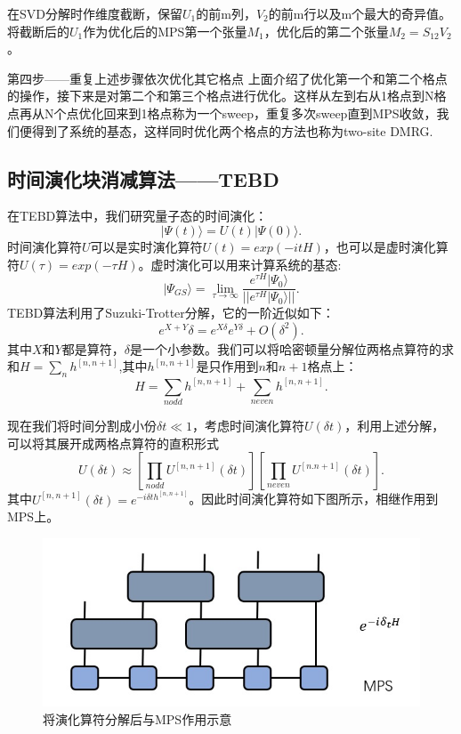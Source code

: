 \documentclass[12pt]{article}
\begin{document}
      在SVD分解时作维度截断，保留$U_1$的前m列，$V_2$的前m行以及m个最大的奇异值。将截断后的$U_1$作为优化后的MPS第一个张量$M_1$，优化后的第二个张量$M_2=S_{12}V_2$。
      
      {\heiti 第四步——重复上述步骤依次优化其它格点}
      上面介绍了优化第一个和第二个格点的操作，接下来是对第二个和第三个格点进行优化。这样从左到右从1格点到N格点再从N个点优化回来到1格点称为一个sweep，重复多次sweep直到MPS收敛，我们便得到了系统的基态，这样同时优化两个格点的方法也称为two-site DMRG. 
	  
	  \subsection{时间演化块消减算法——TEBD}
	  在TEBD算法中，我们研究量子态的时间演化\cite{vidal2003efficient}：
	  \begin{equation}|\Psi(t)\rangle=U(t)|\Psi(0)\rangle.\end{equation}
	  时间演化算符$U$可以是实时演化算符$U(t)=exp(-itH)$，也可以是虚时演化算符$U(\tau)=exp(-\tau H)$。虚时演化可以用来计算系统的基态:
	  \begin{equation}|\Psi_{GS}\rangle=\lim_{\tau\to \infty}\frac{e^{\tau H}|\Psi_0\rangle}{||e^{\tau H}|\Psi_0\rangle||}.\end{equation}
	  TEBD算法利用了Suzuki-Trotter分解，它的一阶近似如下：
	  \begin{equation}e^{X+Y}\delta=e^{X\delta}e^{Y\delta}+O(\delta^2).\end{equation}
	  其中$X$和$Y$都是算符，$\delta$是一个小参数。我们可以将哈密顿量分解位两格点算符的求和$H=\sum_nh^{[n,n+1]}$,其中$h^{[n,n+1]}$是只作用到$n$和$n+1$格点上：
	  \begin{equation}H=\sum_{n odd}h^{[n,n+1]}+\sum_{n even}h^{[n,n+1]}.\end{equation}
	  
	  现在我们将时间分割成小份$\delta t\ll1$，考虑时间演化算符$U(\delta t)$，利用上述分解，可以将其展开成两格点算符的直积形式
	  \begin{equation}U(\delta t)\approx[\prod_{nodd}U^{[n,n+1]}(\delta t)][\prod_{neven}U^{[n.n+1]}(\delta t)].\end{equation}
	  其中$U^{[n,n+1]}(\delta t)=e^{-i\delta th^{[n,n+1]}}$。因此时间演化算符如下图所示，相继作用到MPS上。
	  \begin{figure}[H]
	  	\centering
	  	\includegraphics[scale=0.7]{15.Trotter分解}
	  	\caption[9pt]{将演化算符分解后与MPS作用示意}
	  	\label{fig:15}
	  \end{figure}
      
\end{document}
